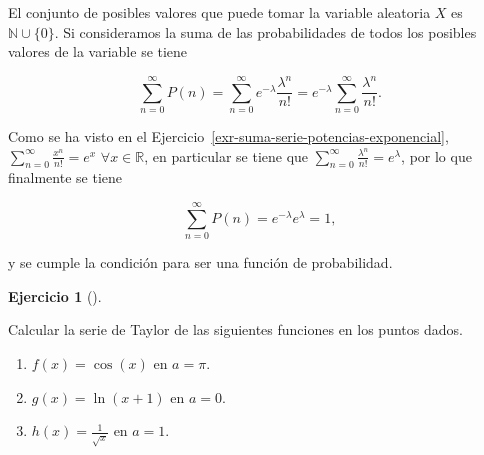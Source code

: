 \documentclass[
  spanish,
  a4paper,
]{scrreport}
\theoremstyle{definition}
\newtheorem{exercise}{Ejercicio}[chapter]
\theoremstyle{remark}
\begin{document}
\begin{tcolorbox}[enhanced jigsaw, arc=.35mm, bottomrule=.15mm, bottomtitle=1mm, breakable, colback=white, colbacktitle=quarto-callout-tip-color!10!white, colframe=quarto-callout-tip-color-frame, coltitle=black, left=2mm, leftrule=.75mm, opacityback=0, opacitybacktitle=0.6, rightrule=.15mm, title=\textcolor{quarto-callout-tip-color}{\faLightbulb}\hspace{0.5em}{Solución}, titlerule=0mm, toprule=.15mm, toptitle=1mm]

El conjunto de posibles valores que puede tomar la variable aleatoria
\(X\) es \(\mathbb{N}\cup \{0\}\). Si consideramos la suma de las
probabilidades de todos los posibles valores de la variable se tiene

\[
\sum_{n=0}^\infty P(n) = \sum_{n=0}^\infty e^{-\lambda}\frac{\lambda^n}{n!} = e^{-\lambda}\sum_{n=0}^\infty \frac{\lambda^n}{n!}.
\]

Como se ha visto en el
Ejercicio~\ref{exr-suma-serie-potencias-exponencial},
\(\sum_{n=0}^\infty \frac{x^n}{n!}=e^x\) \(\forall x\in\mathbb{R}\), en
particular se tiene que
\(\sum_{n=0}^\infty \frac{\lambda^n}{n!}=e^\lambda\), por lo que
finalmente se tiene

\[
\sum_{n=0}^\infty P(n) = e^{-\lambda}e^{\lambda} = 1,
\]

y se cumple la condición para ser una función de probabilidad.

\end{tcolorbox}

\begin{exercise}[]\protect\hypertarget{exr-serie-taylor}{}\label{exr-serie-taylor}

Calcular la serie de Taylor de las siguientes funciones en los puntos
dados.

\begin{enumerate}
\def\labelenumi{\alph{enumi}.}
\item
  \(f(x)=\cos(x)\) en \(a=\pi\).
\item
  \(g(x)=\ln(x+1)\) en \(a=0\).
\item
  \(h(x)=\frac{1}{\sqrt{x}}\) en \(a=1\).
\end{enumerate}

\end{exercise}
\end{document}
